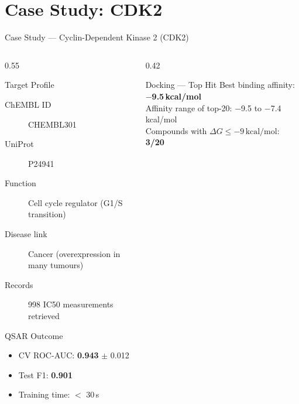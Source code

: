 \section{Case Study: CDK2}

\begin{frame}{Case Study — Cyclin-Dependent Kinase 2 (CDK2)}
  \begin{columns}[T]
    \begin{column}{0.55\textwidth}
      \begin{block}{Target Profile}
        \begin{description}
          \item[ChEMBL ID] CHEMBL301
          \item[UniProt] P24941
          \item[Function] Cell cycle regulator (G1/S transition)
          \item[Disease link] Cancer (overexpression in many tumours)
          \item[Records] 998 IC50 measurements retrieved
        \end{description}
      \end{block}
      \vspace{0.3cm}
      \begin{block}{QSAR Outcome}
        \begin{itemize}
          \item CV ROC-AUC: \textbf{0.943} $\pm$ 0.012
          \item Test F1: \textbf{0.901}
          \item Training time: $<$ 30\,s
        \end{itemize}
      \end{block}
    \end{column}
    \begin{column}{0.42\textwidth}
      \begin{exampleblock}{Docking — Top Hit}
        Best binding affinity: \textbf{$-$9.5\,kcal/mol}\\
        \vspace{0.15cm}
        Affinity range of top-20: $-$9.5 to $-$7.4\,kcal/mol\\
        \vspace{0.15cm}
        Compounds with $\Delta G \leq -9\,\text{kcal/mol}$: \textbf{3/20}
      \end{exampleblock}

\end{column}
\end{columns}
\end{frame}
